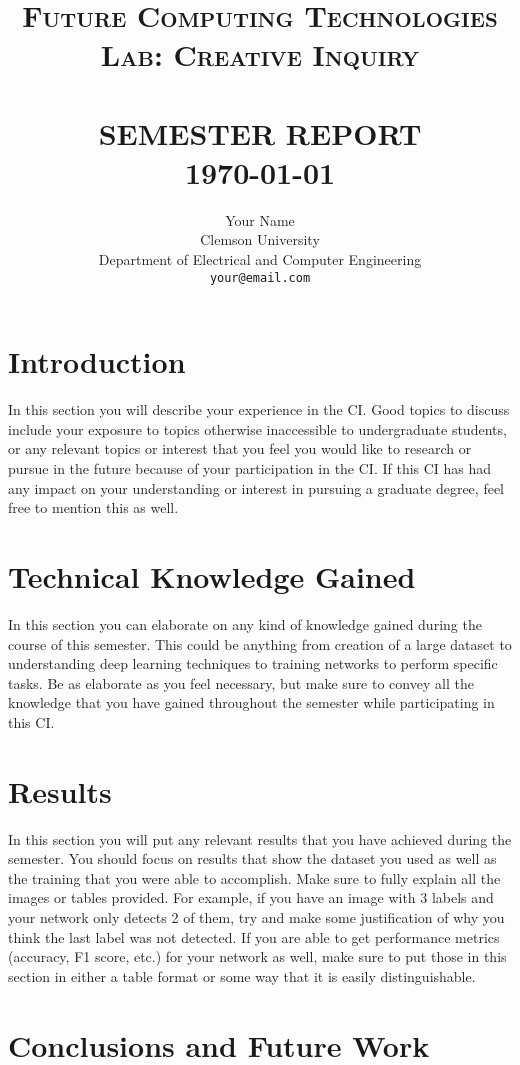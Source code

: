 \documentclass[paper=a4, fontsize=11pt,twoside]{scrartcl}
\title{
    \normalsize \textsc{Future Computing Technologies Lab: Creative Inquiry} \\ [2.0cm]
	\HRule{0.5pt} \\
	\LARGE \textbf{\uppercase{Semester Report}}
	\HRule{2pt} \\ [0.5cm]
	\normalsize \today
}
\author{
	Your Name\\	
	Clemson University\\	
	Department of Electrical and Computer Engineering\\
	\texttt{your@email.com} \\
}
\makeatletter
\def\printtitle{
	{\centering \@title\par}}
\def\printauthor{
	{\centering \large \@author}}
\makeatother
\begin{document}
\thispagestyle{empty}

\printtitle
\vfill
\printauthor
\newpage

\setcounter{page}{1}

\section{Introduction}

In this section you will describe your experience in the CI.  Good topics to discuss include your exposure to topics otherwise inaccessible to undergraduate students, or any relevant topics or interest that you feel you would like to research or pursue in the future because of your participation in the CI. If this CI has had any impact on your understanding or interest in pursuing a graduate degree, feel free to mention this as well.

\section{Technical Knowledge Gained}

In this section you can elaborate on any kind of knowledge gained during the course of this semester.  This could be anything from creation of a large dataset to understanding deep learning techniques to training networks to perform specific tasks.  Be as elaborate as you feel necessary, but make sure to convey all the knowledge that you have gained throughout the semester while participating in this CI.

\section{Results}

In this section you will put any relevant results that you have achieved during the semester.  You should focus on results that show the dataset you used as well as the training that you were able to accomplish.  Make sure to fully explain all the images or tables provided.  For example, if you have an image with 3 labels and your network only detects 2 of them, try and make some justification of why you think the last label was not detected.  If you are able to get performance metrics (accuracy, F1 score, etc.) for your network as well, make sure to put those in this section in either a table format or some way that it is easily distinguishable.

\section{Conclusions and Future Work}
\end{document}

